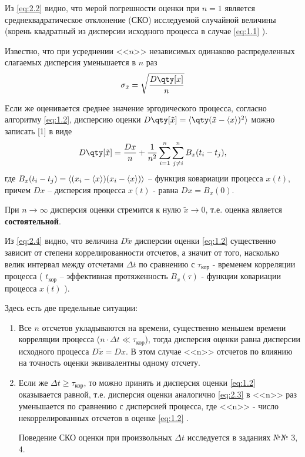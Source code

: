 Из \eqref{eq:2.2} видно, что мерой погрешности оценки при $n=1$ является 
среднеквадратическое отклонение (СКО) исследуемой случайной величины (корень квадратный из дисперсии
исходного процесса в случае \eqref{eq:1.1} ).

Известно, что при усреднении <<$n$>> независимых одинаково распределенных
слагаемых дисперсия уменьшается в $n$ раз
\begin{equation}
\label{eq:2.3}
\sigma_{\tilde x} = \sqrt{ \frac{D\qty[x] }{n}}
\end{equation}

Если же оценивается среднее значение эргодического процесса, согласно алгоритму
\eqref{eq:1.2}, дисперсию оценки $D\qty[\tilde x] = \mean{ \qty( \tilde x - \mean{x} )^2 }$
можно записать [1] в виде
\begin{equation}
\label{eq:2.4}
D\qty[\tilde x] = \frac{D{x}}{n} + \frac{1}{n^2} \sum\limits_{i=1}^{n} \sum\limits_{j\neq i}^{n} B_x(t_i - t_j),
\end{equation}
где $B_x(t_i - t_j) = \langle (x_i - \langle x\rangle) (x_i - \langle x\rangle)  \rangle$ -- функция
ковариации процесса  $x(t)$, причем $D{x}$ -- дисперсия процесса $x(t)$ -
равна $D{x}=B_x(0)$.

При $n \to \infty$ дисперсия оценки стремится к нулю $\tilde x \to 0$, т.е.
оценка является \textbf{состоятельной}.

Из \eqref{eq:2.4} видно, что величина $D{\tilde x}$ дисперсии оценки \eqref{eq:1.2} 
существенно зависит от степени коррелированности отсчетов, а значит от того, насколько
велик интервал между отсчетами $\Delta t$ по сравнению с $\tau_{\text{кор}}$ - временем
корреляции процесса ( $t_{\text{кор}}$ -- эффективная протяженность $B_x(\tau)$ - 
функции ковариации процесса $x(t)$ ).


Здесь есть две предельные ситуации:
\begin{enumerate}
	\item Все $n$ отсчетов укладываются на времени, существенно меньшем времени корреляции
	процесса ($n\cdot \Delta t \ll \tau_{\text{кор}}$), тогда дисперсия оценки равна
	дисперсии исходного процесса $D{\tilde x}= D{x}$. В этом случае <<n>> отсчетов
	по влиянию на точность оценки эквивалентны одному отсчету.
	\item  Если же $\Delta t \geq \tau_{\text{кор}}$, то можно принять  и дисперсия оценки \eqref{eq:1.2} 
	оказывается равной, т.е. дисперсия оценки аналогично \eqref{eq:2.3}  в <<n>> раз уменьшается по сравнению с дисперсией процесса, где <<n>> ‑ число некоррелированных отсчетов в оценке \eqref{eq:1.2} .
	
	Поведение СКО оценки при произвольных $\Delta t$ исследуется в заданиях №№ 3, 4.
\end{enumerate}


